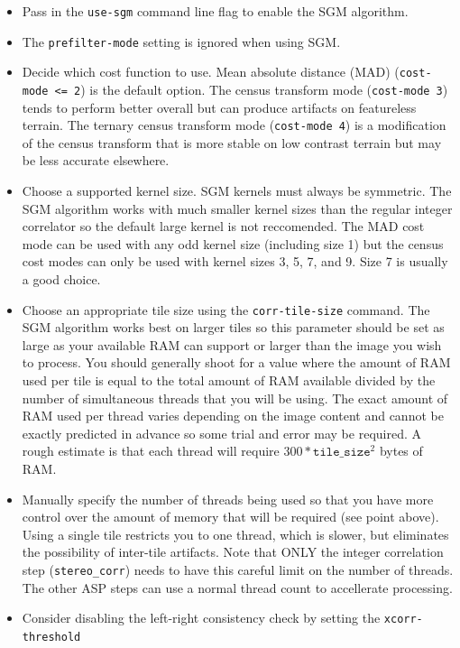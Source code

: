 \begin{itemize}
\item Pass in the \texttt{use-sgm} command line flag to enable the SGM algorithm.
\item The \texttt{prefilter-mode} setting is ignored when using SGM.
\item Decide which cost function to use.  Mean absolute distance (MAD) 
(\texttt{cost-mode <= 2}) is the default option.  
The census transform mode (\texttt{cost-mode 3}) \citep{zabih1994census} tends to 
perform better overall but can produce artifacts on featureless terrain.  
The ternary census transform mode (\texttt{cost-mode 4}) \citep{hua2016texture} 
is a modification of the census transform that is more stable on low contrast terrain
but may be less accurate elsewhere.
\item Choose a supported kernel size.  SGM kernels must always be symmetric.
The SGM algorithm works with much smaller kernel sizes than the regular integer 
correlator so the default large kernel is not reccomended.
The MAD cost mode can be used with any odd kernel size (including size 1) but the census 
cost modes can only be used with kernel sizes 3, 5, 7, and 9.  Size 7 is usually a good choice.
\item Choose an appropriate tile size using the \texttt{corr-tile-size} command. The SGM
algorithm works best on larger tiles so this parameter should be set as large as your
available RAM can support or larger than the image you wish to process.  
You should generally shoot for a value where the amount of
RAM used per tile is equal to the total amount of RAM available divided by the number of
simultaneous threads that you will be using.  The exact amount of RAM used per thread 
varies depending on the image content and cannot be exactly predicted in advance so some
trial and error may be required.  A rough estimate is that each thread will require
$300*\texttt{tile\_size}^2$ bytes of RAM.
\item Manually specify the number of threads being used so that you have more control
over the amount of memory that will be required (see point above).  Using a single tile
restricts you to one thread, which is slower, but eliminates the possibility of inter-tile 
artifacts.  Note that ONLY the integer correlation step (\texttt{stereo\_corr}) needs to 
have this careful limit on the number of threads.  The other ASP steps can use a normal 
thread count to accellerate processing.
\item Consider disabling the left-right consistency check by setting the \texttt{xcorr-threshold}

\end{itemize}
